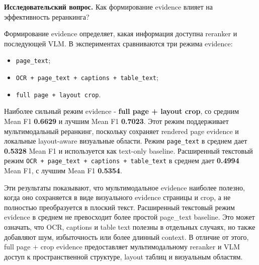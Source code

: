 \documentclass[conference]{IEEEtran}
\begin{document}
\textbf{Исследовательский вопрос.} Как формирование evidence влияет на эффективность реранкинга?

Формирование evidence определяет, какая информация доступна reranker и последующей VLM. В экспериментах сравниваются три режима evidence:

\begin{itemize}
\item \texttt{page\_text};
\item \texttt{OCR + page\_text + captions + table\_text};
\item \texttt{full page + layout crop}.
\end{itemize}

Наиболее сильный режим evidence - \textbf{full page + layout crop}, со средним Mean F1 \textbf{0.6629} и лучшим Mean F1 \textbf{0.7023}. Этот режим поддерживает мультимодальный реранкинг, поскольку сохраняет rendered page evidence и локальные layout-aware визуальные области. Режим \texttt{page\_text} в среднем дает \textbf{0.5328} Mean F1 и используется как text-only baseline. Расширенный текстовый режим \texttt{OCR + page\_text + captions + table\_text} в среднем дает \textbf{0.4994} Mean F1, с лучшим Mean F1 \textbf{0.5354}.

\begin{table}[t]
\caption{Таблица 7}
\centering
\scriptsize
{}
\end{table}

Эти результаты показывают, что мультимодальное evidence наиболее полезно, когда оно сохраняется в виде визуального evidence страницы и crop, а не полностью преобразуется в плоский текст. Расширенный текстовый режим evidence в среднем не превосходит более простой page\_text baseline. Это может означать, что OCR, captions и table text полезны в отдельных случаях, но также добавляют шум, избыточность или более длинный context. В отличие от этого, full page + crop evidence предоставляет мультимодальному reranker и VLM доступ к пространственной структуре, layout таблиц и визуальным областям.
\end{document}
